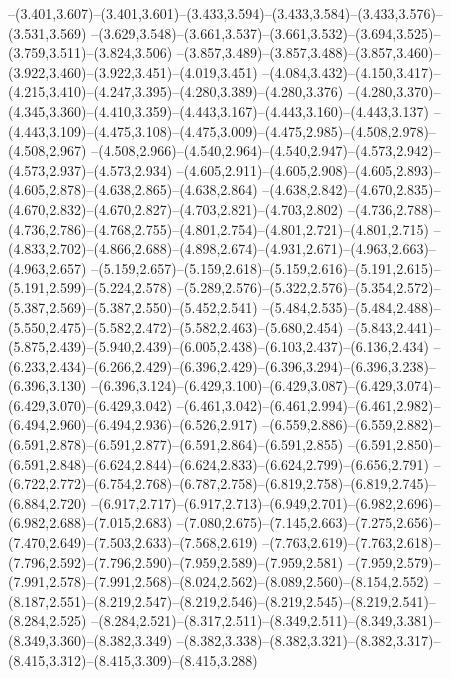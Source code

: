   --(3.401,3.607)--(3.401,3.601)--(3.433,3.594)--(3.433,3.584)--(3.433,3.576)--(3.531,3.569)%
  --(3.629,3.548)--(3.661,3.537)--(3.661,3.532)--(3.694,3.525)--(3.759,3.511)--(3.824,3.506)%
  --(3.857,3.489)--(3.857,3.488)--(3.857,3.460)--(3.922,3.460)--(3.922,3.451)--(4.019,3.451)%
  --(4.084,3.432)--(4.150,3.417)--(4.215,3.410)--(4.247,3.395)--(4.280,3.389)--(4.280,3.376)%
  --(4.280,3.370)--(4.345,3.360)--(4.410,3.359)--(4.443,3.167)--(4.443,3.160)--(4.443,3.137)%
  --(4.443,3.109)--(4.475,3.108)--(4.475,3.009)--(4.475,2.985)--(4.508,2.978)--(4.508,2.967)%
  --(4.508,2.966)--(4.540,2.964)--(4.540,2.947)--(4.573,2.942)--(4.573,2.937)--(4.573,2.934)%
  --(4.605,2.911)--(4.605,2.908)--(4.605,2.893)--(4.605,2.878)--(4.638,2.865)--(4.638,2.864)%
  --(4.638,2.842)--(4.670,2.835)--(4.670,2.832)--(4.670,2.827)--(4.703,2.821)--(4.703,2.802)%
  --(4.736,2.788)--(4.736,2.786)--(4.768,2.755)--(4.801,2.754)--(4.801,2.721)--(4.801,2.715)%
  --(4.833,2.702)--(4.866,2.688)--(4.898,2.674)--(4.931,2.671)--(4.963,2.663)--(4.963,2.657)%
  --(5.159,2.657)--(5.159,2.618)--(5.159,2.616)--(5.191,2.615)--(5.191,2.599)--(5.224,2.578)%
  --(5.289,2.576)--(5.322,2.576)--(5.354,2.572)--(5.387,2.569)--(5.387,2.550)--(5.452,2.541)%
  --(5.484,2.535)--(5.484,2.488)--(5.550,2.475)--(5.582,2.472)--(5.582,2.463)--(5.680,2.454)%
  --(5.843,2.441)--(5.875,2.439)--(5.940,2.439)--(6.005,2.438)--(6.103,2.437)--(6.136,2.434)%
  --(6.233,2.434)--(6.266,2.429)--(6.396,2.429)--(6.396,3.294)--(6.396,3.238)--(6.396,3.130)%
  --(6.396,3.124)--(6.429,3.100)--(6.429,3.087)--(6.429,3.074)--(6.429,3.070)--(6.429,3.042)%
  --(6.461,3.042)--(6.461,2.994)--(6.461,2.982)--(6.494,2.960)--(6.494,2.936)--(6.526,2.917)%
  --(6.559,2.886)--(6.559,2.882)--(6.591,2.878)--(6.591,2.877)--(6.591,2.864)--(6.591,2.855)%
  --(6.591,2.850)--(6.591,2.848)--(6.624,2.844)--(6.624,2.833)--(6.624,2.799)--(6.656,2.791)%
  --(6.722,2.772)--(6.754,2.768)--(6.787,2.758)--(6.819,2.758)--(6.819,2.745)--(6.884,2.720)%
  --(6.917,2.717)--(6.917,2.713)--(6.949,2.701)--(6.982,2.696)--(6.982,2.688)--(7.015,2.683)%
  --(7.080,2.675)--(7.145,2.663)--(7.275,2.656)--(7.470,2.649)--(7.503,2.633)--(7.568,2.619)%
  --(7.763,2.619)--(7.763,2.618)--(7.796,2.592)--(7.796,2.590)--(7.959,2.589)--(7.959,2.581)%
  --(7.959,2.579)--(7.991,2.578)--(7.991,2.568)--(8.024,2.562)--(8.089,2.560)--(8.154,2.552)%
  --(8.187,2.551)--(8.219,2.547)--(8.219,2.546)--(8.219,2.545)--(8.219,2.541)--(8.284,2.525)%
  --(8.284,2.521)--(8.317,2.511)--(8.349,2.511)--(8.349,3.381)--(8.349,3.360)--(8.382,3.349)%
  --(8.382,3.338)--(8.382,3.321)--(8.382,3.317)--(8.415,3.312)--(8.415,3.309)--(8.415,3.288)%
